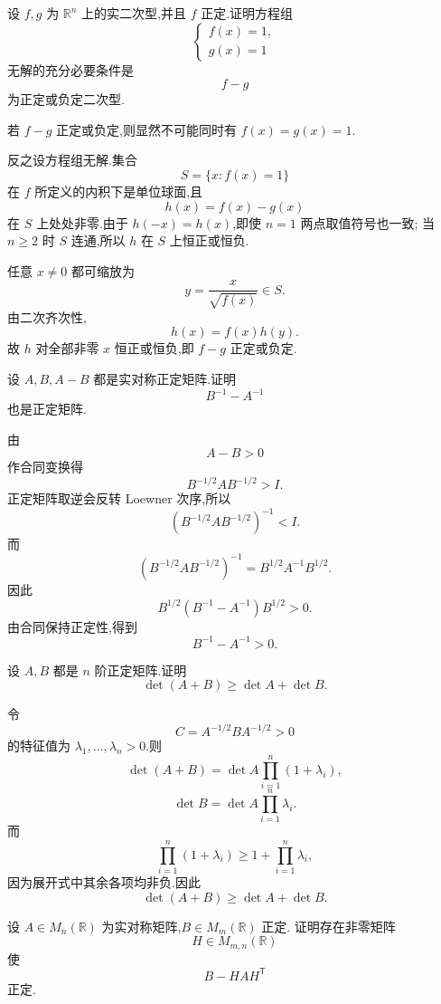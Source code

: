 \begin{example}
设 $f,g$ 为 $\mathbb{R}^n$ 上的实二次型,并且 $f$ 正定.证明方程组
\[
\begin{cases}
f(x)=1,\\
g(x)=1
\end{cases}
\]
无解的充分必要条件是
\[
f-g
\]
为正定或负定二次型.
\end{example}
\exampleblank

\begin{solution}
若 $f-g$ 正定或负定,则显然不可能同时有 $f(x)=g(x)=1$.

反之设方程组无解.集合
\[
S=\{x:f(x)=1\}
\]
在 $f$ 所定义的内积下是单位球面,且
\[
h(x)=f(x)-g(x)
\]
在 $S$ 上处处非零.由于 $h(-x)=h(x)$,即使 $n=1$ 两点取值符号也一致;
当 $n\ge2$ 时 $S$ 连通,所以 $h$ 在 $S$ 上恒正或恒负.

任意 $x\neq0$ 都可缩放为
\[
y=\dfrac{x}{\sqrt{f(x)}}\in S.
\]
由二次齐次性,
\[
h(x)=f(x)h(y).
\]
故 $h$ 对全部非零 $x$ 恒正或恒负,即 $f-g$ 正定或负定.
\end{solution}


\begin{example}
设 $A,B,A-B$ 都是实对称正定矩阵.证明
\[
B^{-1}-A^{-1}
\]
也是正定矩阵.
\end{example}
\exampleblank

\begin{solution}
由
\[
A-B>0
\]
作合同变换得
\[
B^{-1/2}AB^{-1/2}>I.
\]
正定矩阵取逆会反转 Loewner 次序,所以
\[
(B^{-1/2}AB^{-1/2})^{-1}<I.
\]
而
\[
(B^{-1/2}AB^{-1/2})^{-1}
=
B^{1/2}A^{-1}B^{1/2}.
\]
因此
\[
B^{1/2}(B^{-1}-A^{-1})B^{1/2}>0.
\]
由合同保持正定性,得到
\[
\boxed{B^{-1}-A^{-1}>0}.
\]
\end{solution}


\begin{example}[\markstar]
设 $A,B$ 都是 $n$ 阶正定矩阵.证明
\[
\det(A+B)\ge\det A+\det B.
\]
\end{example}
\exampleblank

\begin{solution}
令
\[
C=A^{-1/2}BA^{-1/2}>0
\]
的特征值为 $\lambda_1,\ldots,\lambda_n>0$.则
\[
\det(A+B)
=
\det A\prod\limits_{i=1}^{n}(1+\lambda_i),
\]
\[
\det B
=
\det A\prod\limits_{i=1}^{n}\lambda_i.
\]
而
\[
\displaystyle\prod\limits_{i=1}^{n}(1+\lambda_i)
\ge
1+\prod\limits_{i=1}^{n}\lambda_i,
\]
因为展开式中其余各项均非负.因此
\[
\boxed{\det(A+B)\ge\det A+\det B}.
\]
\end{solution}


\begin{example}
设 $A\in M_n(\mathbb{R})$ 为实对称矩阵,$B\in M_m(\mathbb{R})$ 正定.
证明存在非零矩阵
\[
H\in M_{m,n}(\mathbb{R})
\]
使
\[
B-HAH^{\mathsf T}
\]
正定.
\end{example}
\exampleblank

